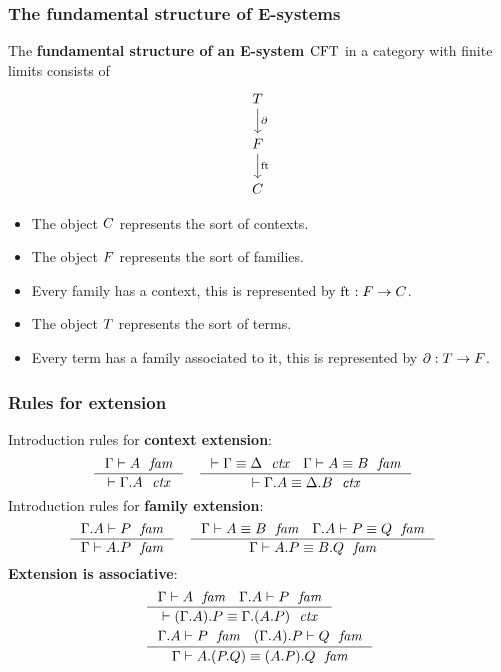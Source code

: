\documentclass{beamer}
\newcommand\important[1]{\textbf{\color{red!90!black}#1}}
\begin{document}
\begin{frame}
\frametitle{\bf The fundamental structure of E-systems}
The \important{fundamental structure of an E-system $\mathrm{CFT}$} in a category with finite limits consists of
\begin{equation*}
\begin{tikzcd}
\stesyst
  \ar{d}{\ebd}
  \\
\stesysf
  \ar{d}{\eft}
  \\
\stesysc
\end{tikzcd}
\end{equation*}
\pause
\begin{itemize}
\item The object $C$ represents the sort of contexts.
\pause
\item The object $F$ represents the sort of families.
\pause
\item Every family has a context, this is represented by $\mathrm{ft}_{}:F\to C$.
\pause
\item The object $T$ represents the sort of terms.
\pause
\item Every term has a family associated to it, this is represented by
$\partial:T\to F$.
\end{itemize}
\end{frame}

\begin{frame}
\frametitle{\bf Rules for extension}
Introduction rules for \important{context extension}:
\begin{align*}
& \inference
  { \jfam{\Gamma}{A}
    }
  { \jctx{\ctxext{\Gamma}{A}}
    }
& & \inference
    { \jctxeq{\Gamma}{\Delta}
      \jfameq{\Gamma}{A}{B}
      }
    { \jctxeq{\ctxext{\Gamma}{A}}{\ctxext{\Delta}{B}}
      }
\end{align*}
\pause
Introduction rules for \important{family extension}:
\begin{align*}
& \inference
  { \jfam{{\Gamma}{A}}{P}
    }
  { \jfam{\Gamma}{\ctxext{A}{P}}
    }
& & \inference
    { \jfameq{\Gamma}{A}{B} 
      \jfameq{{\Gamma}{A}}{P}{Q}
      }
    { \jfameq{\Gamma}{\ctxext{A}{P}}{\ctxext{B}{Q}}
      }
\end{align*}
\pause
\important{Extension is associative}:
\begin{align*}
& \inference
  { \jfam{\Gamma}{A}
    \jfam{{\Gamma}{A}}{P}
    }
  { \jctxeq{\ctxext{{\Gamma}{A}}{P}}{\ctxext{\Gamma}{{A}{P}}}
    }
  \\
& \inference
  { \jfam{{\Gamma}{A}}{P}
    \jfam{{{\Gamma}{A}}{P}}{Q}
    }
  { \jfameq{\Gamma}{\ctxext{A}{{P}{Q}}}{\ctxext{{A}{P}}{Q}}
    }
\end{align*}
\end{frame}
\end{document}
